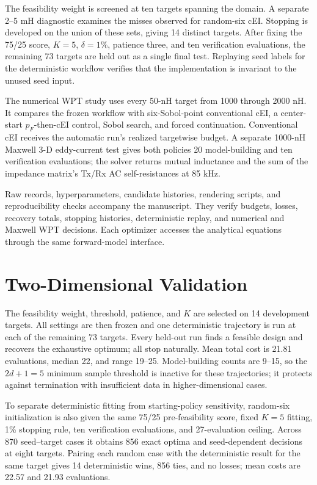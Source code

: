 \documentclass[10pt,conference,letterpaper]{IEEEtran}
\begin{document}
The feasibility weight is screened at ten targets spanning the domain. A separate 2--5 mH diagnostic examines the misses observed for random-six cEI. Stopping is developed on the union of these sets, giving 14 distinct targets. After fixing the 75/25 score, $K=5$, $\delta=1\%$, patience three, and ten verification evaluations, the remaining 73 targets are held out as a single final test. Replaying seed labels for the deterministic workflow verifies that the implementation is invariant to the unused seed input.

The numerical WPT study uses every 50-nH target from 1000 through 2000 nH. It compares the frozen workflow with six-Sobol-point conventional cEI, a center-start $p_F$-then-cEI control, Sobol search, and forced continuation. Conventional cEI receives the automatic run's realized targetwise budget. A separate 1000-nH Maxwell 3-D eddy-current test gives both policies 20 model-building and ten verification evaluations; the solver returns mutual inductance and the sum of the impedance matrix's Tx/Rx AC self-resistances at 85 kHz.

Raw records, hyperparameters, candidate histories, rendering scripts, and reproducibility checks accompany the manuscript. They verify budgets, losses, recovery totals, stopping histories, deterministic replay, and numerical and Maxwell WPT decisions. Each optimizer accesses the analytical equations through the same forward-model interface.

\section{Two-Dimensional Validation}
The feasibility weight, threshold, patience, and $K$ are selected on 14 development targets. All settings are then frozen and one deterministic trajectory is run at each of the remaining 73 targets. Every held-out run finds a feasible design and recovers the exhaustive optimum; all stop naturally. Mean total cost is 21.81 evaluations, median 22, and range 19--25. Model-building counts are 9--15, so the $2d+1=5$ minimum sample threshold is inactive for these trajectories; it protects against termination with insufficient data in higher-dimensional cases.

To separate deterministic fitting from starting-policy sensitivity, random-six initialization is also given the same 75/25 pre-feasibility score, fixed $K=5$ fitting, 1\% stopping rule, ten verification evaluations, and 27-evaluation ceiling. Across 870 seed--target cases it obtains 856 exact optima and seed-dependent decisions at eight targets. Pairing each random case with the deterministic result for the same target gives 14 deterministic wins, 856 ties, and no losses; mean costs are 22.57 and 21.93 evaluations.
\end{document}
